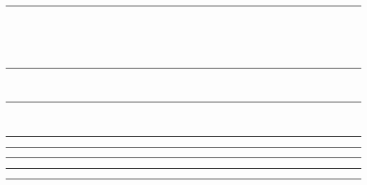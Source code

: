 \documentclass{article}
\begin{document}
\hrule
\begin{code}%
\>[0]\<%
\\
\>[0] \<%
\\
\>[0]\AgdaIndent{}\<[2]%
\>[2] \AgdaSymbol{:}  \<%
\\
\>[0]\AgdaIndent{}\<[2]%
\>[2] \AgdaSymbol{:}  \<[11]%
\>[11]\<%
\end{code}
\hrule
\begin{code}%
\>[0]\<%
\\
\>[0]\AgdaIndent{}\<[2]%
\>[2]\<%
\end{code}
\hrule
\begin{code}%
\>[0]\<%
\\
\>[0]\<%
\end{code}
\hrule
\begin{code}%
\>[0]\<%
\end{code}
\hrule
\begin{code}%
\>[0]\AgdaIndent{}\<[2]%
\>[2]\<%
\end{code}
\hrule
  \begin{code}%
\>[0]\AgdaIndent{}\<[2]%
\>[2]\<%
\end{code}
\hrule
  \begin{code}%
\>[0]\AgdaIndent{}\<[2]%
\>[2]\<%
\end{code}
\hrule
\end{document}
